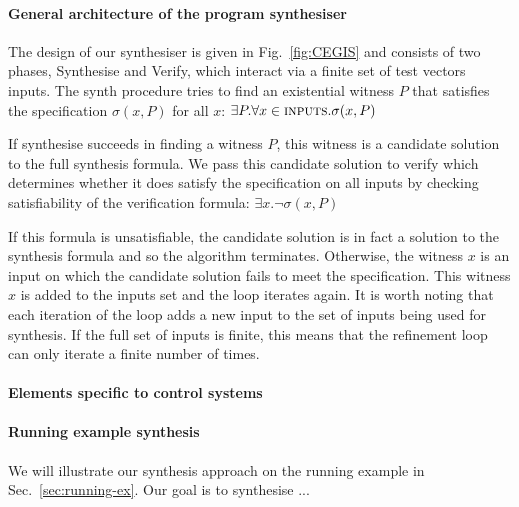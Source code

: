 \documentclass{sig-alternate-05-2015}
\begin{document}

\paragraph{General architecture of the program synthesiser}
%
The design of our synthesiser is given in
Fig.~\ref{fig:CEGIS} and consists of two phases, {\sc
Synthesise} and {\sc Verify}, which interact via a finite set of test vectors {\sc inputs}.
The {\sc synth} procedure tries to find an existential witness $P$
that satisfies the specification $\sigma(x, P)$ for all $x$:
%
$\exists P . \forall x \in \text{\sc inputs} . \sigma(x, P)$

If {\sc synthesise} succeeds in finding a witness $P$, this witness is a
candidate solution to the full synthesis formula.  We pass this candidate
solution to {\sc verify} which determines whether it does satisfy
the specification on all inputs by checking satisfiability of the
verification formula:
%
$\exists x . \lnot \sigma(x, P)$

If this formula is unsatisfiable, the candidate solution is in fact a
solution to the synthesis formula and so the algorithm terminates. 
Otherwise, the witness $x$ is an input on which the candidate solution fails
to meet the specification.  This witness $x$ is added to the {\sc inputs}
set and the loop iterates again.  It is worth noting that each iteration of the
loop adds a new input to the set of inputs being used for synthesis.  If
the full set of inputs is finite, this means that the refinement loop
can only iterate a finite number of times.


\paragraph{Elements specific to control systems}

\paragraph{Running example synthesis}
We will illustrate our synthesis approach on the running example 
in Sec.~\ref{sec:running-ex}.
Our goal is to synthesise ...
\end{document}
